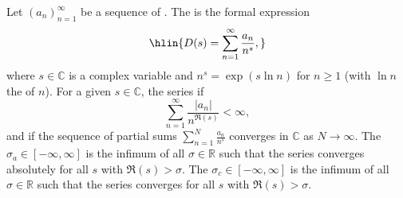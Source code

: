 \begin{definition}
\label{definition:dirichlet_series_of_a_sequence_of_complex_numbers}
Let $(a_n)_{n=1}^\infty$ be a sequence of .
The  is the formal expression
$$\hlin{D(s) = \sum_{n=1}^\infty \frac{a_n}{n^s},}$$
where $s \in \mathbb{C}$ is a complex variable and $n^s = \exp(s \ln n)$ for $n \ge 1$ (with $\ln n$ the  of $n$).
For a given $s \in \mathbb{C}$, the series  if
$$\sum_{n=1}^\infty \frac{|a_n|}{n^{\Re(s)}} < \infty,$$
and  if the sequence of partial sums $\sum_{n=1}^N \frac{a_n}{n^s}$ converges in $\mathbb{C}$ as $N \to \infty$.
The  $\sigma_a \in [-\infty, \infty]$ is the infimum of all $\sigma \in \mathbb{R}$ such that the series converges absolutely for all $s$ with $\Re(s) > \sigma$.
The  $\sigma_c \in [-\infty, \infty]$ is the infimum of all $\sigma \in \mathbb{R}$ such that the series converges for all $s$ with $\Re(s) > \sigma$.
\end{definition}